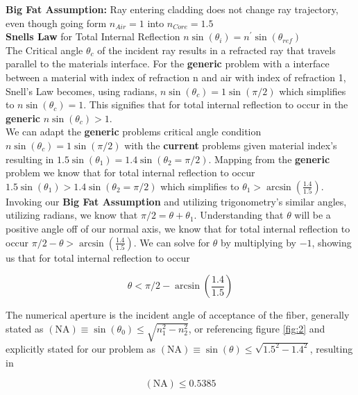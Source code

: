 \documentclass[main.tex]{subfiles}
\begin{document}
\textbf{Big Fat Assumption:} Ray entering cladding does not change ray trajectory, even though going form $n_{Air} = 1$ into $n_{Core} = 1.5$\\

\textbf{Snells Law} for Total Internal Reflection $n\sin(\theta_i) = n^{\prime}\sin(\theta_{ref})$\\

The Critical angle $\theta_c$ of the incident ray results in a refracted ray that travels parallel to the materials interface. For the \textbf{generic} problem with a interface between a material with index of refraction n and air with index of refraction 1, Snell's Law becomes, using radians, $n\sin(\theta_c) = 1\sin(\pi/2)$ which simplifies to $n\sin(\theta_c) = 1$. This signifies that for total internal reflection to occur in the \textbf{generic}  $n\sin(\theta_c) > 1$. \\

We can adapt the \textbf{generic} problems critical angle condition $n\sin(\theta_c) = 1\sin(\pi/2)$ with the \textbf{current} problems given material index's resulting in  $1.5\sin(\theta_1) = 1.4\sin(\theta_2 = \pi/2)$. Mapping from the \textbf{generic} problem we know that for total internal reflection to occur $1.5\sin(\theta_1) > 1.4\sin(\theta_2 = \pi/2)$ which simplifies to $\theta_1 > \arcsin(\frac{1.4}{1.5})$.\\

Invoking our \textbf{Big Fat Assumption} and utilizing trigonometry's similar angles, utilizing radians, we know that $\pi/2 = \theta  + \theta_1$. Understanding that $\theta$ will be a positive angle off of our normal axis, we know that for total internal reflection to occur $\pi/2 - \theta > \arcsin(\frac{1.4}{1.5})$. We can solve for $\theta$ by multiplying by $-1$, showing us that for total internal reflection to occur 

\begin{equation}\label{eq:2a}
\theta < \pi/2 - \arcsin(\frac{1.4}{1.5})
\end{equation}

The numerical aperture is the incident angle of acceptance of the fiber, generally stated as $(\text{NA}) \equiv \sin(\theta_0) \leq \sqrt{n_1^2 - n_2^2}$, or referencing figure \ref{fig:2} and explicitly stated for our problem as $(\text{NA}) \equiv \sin(\theta) \leq \sqrt{1.5^2 - 1.4^2}$, resulting in 

\begin{equation}\label{eq:2b}
(\text{NA}) \leq 0.5385
\end{equation}
\end{document}
